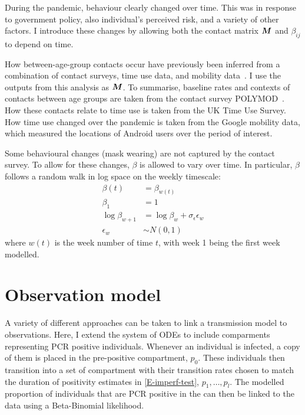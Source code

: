\documentclass[thesis.tex]{subfiles}
\begin{document}
During the pandemic, behaviour clearly changed over time.
This was in response to government policy, also individual's perceived risk, and a variety of other factors.
I introduce these changes by allowing both the contact matrix $\bm{M}$ and $\beta_{ij}$ to depend on time.

How between-age-group contacts occur have previously been inferred from a combination of contact surveys, time use data, and mobility data~\autocites{vanleeuwenTime}{vanleeuwenAugmenting}.
I use the outputs from this analysis as $\bm{M}$.
To summarise, baseline rates and contexts of contacts between age groups are taken from the contact survey POLYMOD~\autocite{mossongSocial}.
How these contacts relate to time use is taken from the UK Time Use Survey.
How time use changed over the pandemic is taken from the Google mobility data, which measured the locations of Android users over the period of interest.

Some behavioural changes (\eg mask wearing) are not captured by the contact survey.
To allow for these changes, $\beta$ is allowed to vary over time.
In particular, $\beta$ follows a random walk in log space on the weekly timescale:
\begin{align}
    \beta(t) &= \beta_{w(t)} \\
    \beta_1 &= 1 \\
    \log\beta_{w+1} &= \log\beta_w + \sigma_\epsilon \epsilon_w \\
    \epsilon_w &\sim N(0, 1)
\end{align}
where $w(t)$ is the week number of time $t$, with week 1 being the first week modelled.

\section{Observation model} \label{SEIR:sec:observation}

A variety of different approaches can be taken to link a transmission model to observations.
Here, I extend the system of ODEs to include comparments representing PCR positive individuals.
Whenever an individual is infected, a copy of them is placed in the pre-positive compartment, $p_0$.
These individuals then transition into a set of compartment with their transition rates chosen to match the duration of positivity estimates in \cref{E-imperf-test}, $p_1, \dots, p_l$.
The modelled proportion of individuals that are PCR positive in the can then be linked to the data using a Beta-Binomial likelihood.
\end{document}
